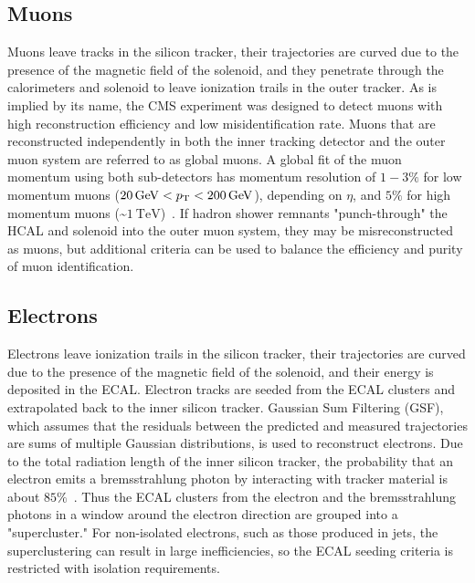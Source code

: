 \subsection{Muons}
\label{PF_Reconstruction_Muons}
Muons leave tracks in the silicon tracker, their trajectories are curved due to the presence of the magnetic field of the solenoid, and they penetrate through the calorimeters and solenoid to leave ionization trails in the outer tracker.
As is implied by its name, the CMS experiment was designed to detect muons with high reconstruction efficiency and low misidentification rate.
Muons that are reconstructed independently in both the inner tracking detector and the outer muon system are referred to as global muons.
A global fit of the muon momentum using both sub-detectors has momentum resolution of $1-3\%$ for low momentum muons ($\SI{20}{\GeV} < \pT < \SI{200}{\GeV}$), depending on $\eta$, and $5\%$ for high momentum muons (\sim$\SI{1}{\TeV}$)~\cite{Chatrchyan:1129810}.
If hadron shower remnants "punch-through" the HCAL and solenoid into the outer muon system, they may be misreconstructed as muons, but additional criteria can be used to balance the efficiency and purity of muon identification.

\subsection{Electrons}
\label{PF_Reconstruction_Electrons}
Electrons leave ionization trails in the silicon tracker, their trajectories are curved due to the presence of the magnetic field of the solenoid, and their energy is deposited in the ECAL.
Electron tracks are seeded from the ECAL clusters and extrapolated back to the inner silicon tracker.
Gaussian Sum Filtering (GSF), which assumes that the residuals between the predicted and measured trajectories are sums of multiple Gaussian distributions, is used to reconstruct electrons.
Due to the total radiation length of the inner silicon tracker, the probability that an electron emits a bremsstrahlung photon by interacting with tracker material is about $85\%$~\cite{Sirunyan:2270046}.
Thus the ECAL clusters from the electron and the bremsstrahlung photons in a window around the electron direction are grouped into a "supercluster."
For non-isolated electrons, such as those produced in jets, the superclustering can result in large inefficiencies, so the ECAL seeding criteria is restricted with isolation requirements.

